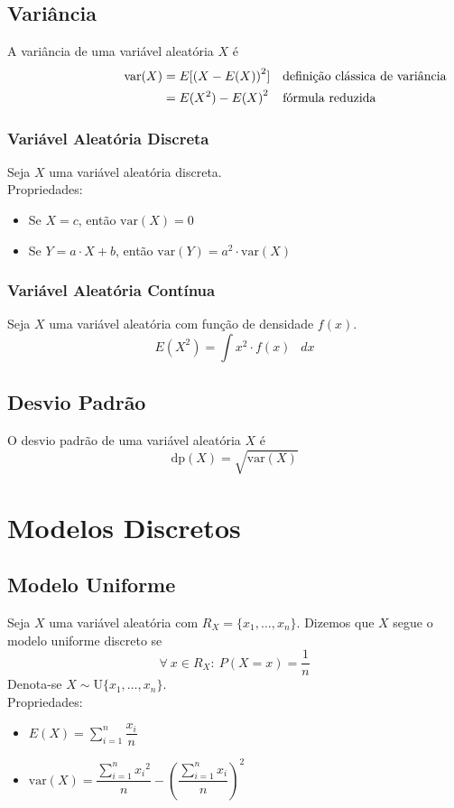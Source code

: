 \documentclass{article}
\newcommand*\diff{\mathop{}\!d}
\begin{document}
\pagebreak


\subsection{Variância}
A variância de uma variável aleatória $X$ é
\begin{align*}
  \hspace{80px} \text{var}(X) & = E[{(X - E(X))}^2] && \text{definição clássica de variância} \\
  & = E(X^2) - {E(X)}^2 && \text{fórmula reduzida}
\end{align*}

\subsubsection{Variável Aleatória Discreta}
Seja $X$ uma variável aleatória discreta. \\[5pt]
Propriedades:
\begin{itemize}
  \item Se $X = c$, então $\text{var}(X) = 0$
  \item Se $Y = a \cdot X + b$, então $\text{var}(Y) = a^2 \cdot \text{var}(X)$
\end{itemize}

\subsubsection{Variável Aleatória Contínua}
Seja $X$ uma variável aleatória com função de densidade $f(x)$. \\
\[ E(X^2) = \int x^2 \cdot f(x) \> \diff x\]


\subsection{Desvio Padrão}
O desvio padrão de uma variável aleatória $X$ é
\[ \text{dp}(X) = \sqrt{\text{var}(X)} \]



\section{Modelos Discretos}


\subsection{Modelo Uniforme}
Seja $X$ uma variável aleatória com $R_X = \{ x_1, \hdots, x_n \}$. Dizemos que $X$ segue o modelo uniforme discreto se
\[ \forall\: x \in R_X :\> P(X = x) = \frac{1}{n} \]
Denota-se $X \sim \text{U}\{x_1, \hdots, x_n\}$. \\[10pt]
Propriedades:
\begin{itemize}
  \item $E(X) = \sum\limits_{i=1}^{n} \dfrac{x_i}{n}$
  \item $\text{var}(X) = \dfrac{\sum\limits_{i=1}^{n} {x_i}^2}{n} - {\left( \dfrac{\sum\limits_{i=1}^{n} x_i}{n} \right)}^2$
\end{itemize}
\end{document}
